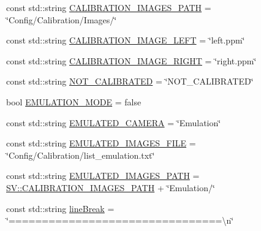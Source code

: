 \begin{DoxyCompactItemize}
\item 
const std\-::string \hyperlink{namespace_s_v_aca9f280a6ae4110ddbfcb3db20c40931}{C\-A\-L\-I\-B\-R\-A\-T\-I\-O\-N\-\_\-\-I\-M\-A\-G\-E\-S\-\_\-\-P\-A\-T\-H} = \char`\"{}Config/Calibration/Images/\char`\"{}
\item 
const std\-::string \hyperlink{namespace_s_v_a7eee3c30084ee151a5d8e793f448dfca}{C\-A\-L\-I\-B\-R\-A\-T\-I\-O\-N\-\_\-\-I\-M\-A\-G\-E\-\_\-\-L\-E\-F\-T} = \char`\"{}left.\-ppm\char`\"{}
\item 
const std\-::string \hyperlink{namespace_s_v_a6b93f40cb116005baad0fa89d5e3ded3}{C\-A\-L\-I\-B\-R\-A\-T\-I\-O\-N\-\_\-\-I\-M\-A\-G\-E\-\_\-\-R\-I\-G\-H\-T} = \char`\"{}right.\-ppm\char`\"{}
\item 
const std\-::string \hyperlink{namespace_s_v_af29adc97546d0aacc73089470104b7e6}{N\-O\-T\-\_\-\-C\-A\-L\-I\-B\-R\-A\-T\-E\-D} = \char`\"{}N\-O\-T\-\_\-\-C\-A\-L\-I\-B\-R\-A\-T\-E\-D\char`\"{}
\item 
bool \hyperlink{namespace_s_v_abef27351d2e2c8b13783f080571edca8}{E\-M\-U\-L\-A\-T\-I\-O\-N\-\_\-\-M\-O\-D\-E} = false
\item 
const std\-::string \hyperlink{namespace_s_v_ab43026f6f6ee1b8e5cc36194a2ea9e6b}{E\-M\-U\-L\-A\-T\-E\-D\-\_\-\-C\-A\-M\-E\-R\-A} = \char`\"{}Emulation\char`\"{}
\item 
const std\-::string \hyperlink{namespace_s_v_a4a601cd489e8ca00c55bb2785c8bb5d9}{E\-M\-U\-L\-A\-T\-E\-D\-\_\-\-I\-M\-A\-G\-E\-S\-\_\-\-F\-I\-L\-E} = \char`\"{}Config/Calibration/list\-\_\-emulation.\-txt\char`\"{}
\item 
const std\-::string \hyperlink{namespace_s_v_ab98fb68d38e7637f92d456f945dfd2ff}{E\-M\-U\-L\-A\-T\-E\-D\-\_\-\-I\-M\-A\-G\-E\-S\-\_\-\-P\-A\-T\-H} = \hyperlink{namespace_s_v_aca9f280a6ae4110ddbfcb3db20c40931}{S\-V\-::\-C\-A\-L\-I\-B\-R\-A\-T\-I\-O\-N\-\_\-\-I\-M\-A\-G\-E\-S\-\_\-\-P\-A\-T\-H} + \char`\"{}Emulation/\char`\"{}
\item 
const std\-::string \hyperlink{namespace_s_v_aa04b6739e3012b22c033d003c26d5584}{line\-Break} = \char`\"{}================================\textbackslash{}n\char`\"{}
\end{DoxyCompactItemize}


